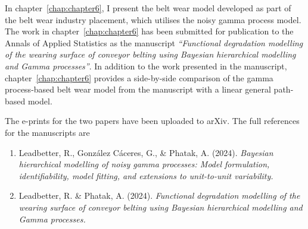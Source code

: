 \documentclass[apa,colorlinks,emptypage]{curtinThesis}
\begin{document}
In chapter~\ref{chap:chapter6}, I present the belt wear model developed as part of the belt wear industry placement, which utilises the noisy gamma process model. The work in chapter~\ref{chap:chapter6} has been submitted for publication to the Annals of Applied Statistics as the manuscript \textit{``Functional degradation modelling of the wearing surface of conveyor belting using Bayesian hierarchical modelling and Gamma processes''}. In addition to the work presented in the manuscript, chapter~\ref{chap:chapter6} provides a side-by-side comparison of the gamma process-based belt wear model from the manuscript with a linear general path-based model.

The e-prints for the two papers have been uploaded to arXiv. The full references for the manuscripts are
\begin{enumerate}
  \item Leadbetter, R., Gonz\'{a}lez C\'{a}ceres, G., \& Phatak, A. (2024). \textit{Bayesian hierarchical modelling of noisy gamma processes: Model formulation, identifiability, model fitting, and extensions to unit-to-unit variability.}
  \item Leadbetter, R. \& Phatak, A. (2024). \textit{Functional degradation modelling of the wearing surface of conveyor belting using Bayesian hierarchical modelling and Gamma processes.}
\end{enumerate}







\begin{customappendix}{} %



\end{customappendix}

\backmatter{}

\ackstatement %
\end{document}
